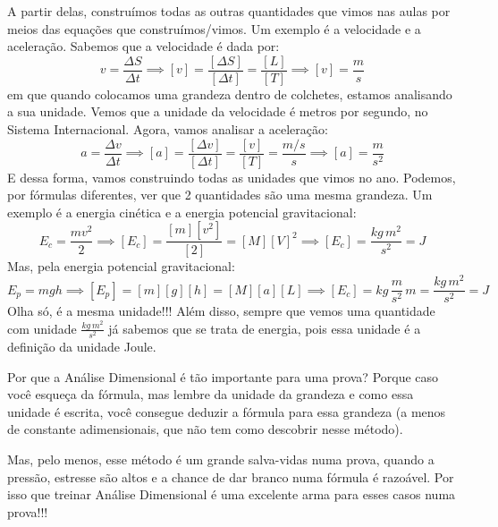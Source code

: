 \documentclass[12pt]{extarticle}
\newcommand{\<}{\langle}
\renewcommand{\>}{\rangle}
\theoremstyle{definition}
\begin{document}
A partir delas, construímos todas as outras quantidades que vimos nas aulas por meios das equações que construímos/vimos. Um exemplo é a velocidade e a aceleração. Sabemos que a velocidade é dada por:
\begin{equation}
    v= \frac{\Delta S}{\Delta t} \implies [v] = \frac{[\Delta S]}{[\Delta t]} = \frac{[L]}{[T]} \implies \boxed{[v] = \frac{m}{s}}
\end{equation}
\noindent em que quando colocamos uma grandeza dentro de colchetes, estamos analisando a sua unidade. Vemos que a unidade da velocidade é metros por segundo, no Sistema Internacional. Agora, vamos analisar a aceleração:
\begin{equation}
    a= \frac{\Delta v}{\Delta t} \implies [a] = \frac{[\Delta v]}{[\Delta t]} = \frac{[v]}{[T]} = \frac{m/s}{s} \implies \boxed{[a] = \frac{m}{s^2}}
\end{equation}
E dessa forma, vamos construindo todas as unidades que vimos no ano. Podemos, por fórmulas diferentes, ver que 2 quantidades são uma mesma grandeza. Um exemplo é a energia cinética e a energia potencial gravitacional:
\begin{equation}
    E_c = \frac{mv^2}{2} \implies[E_c] = \frac{[m][v^2]}{[2]} = [M][V]^2 \implies \boxed{[E_c] = \frac{kg\,m^2}{s^2} = J}
\end{equation}
Mas, pela energia potencial gravitacional:
\begin{equation}
     E_p = mgh \implies[E_p] = [m][g][h] = [M][a][L] \implies \boxed{[E_c] = kg\,\frac{m}{s^2}\,m = \frac{kg\,m^2}{s^2} = J}
\end{equation}
Olha só, é a mesma unidade!!! Além disso, sempre que vemos uma quantidade com unidade $\frac{kg\,m^2}{s^2}$ já sabemos que se trata de energia, pois essa unidade é a definição da unidade Joule.

Por que a Análise Dimensional é tão importante para uma prova? Porque caso você esqueça da fórmula, mas lembre da unidade da grandeza e como essa unidade é escrita, você consegue deduzir a fórmula para essa grandeza (a menos de constante adimensionais, que não tem como descobrir nesse método).

Mas, pelo menos, esse método é um grande salva-vidas numa prova, quando a pressão, estresse são altos e a chance de dar branco numa fórmula é razoável. Por isso que treinar Análise Dimensional é uma excelente arma para esses casos numa prova!!!
\end{document}
